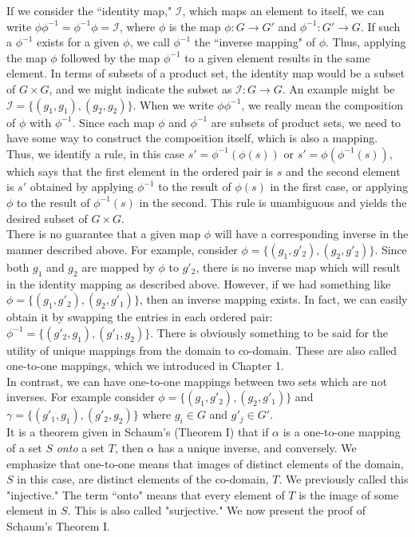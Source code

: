 If we consider the ``identity map," $\mathcal{I}$, which maps an element to itself, we can write $\phi \phi^{-1}=\phi^{-1} \phi = \mathcal{I}$, where $\phi$ is the map $\phi: G \rightarrow G'$ and $\phi^{-1}: G' \rightarrow G$.  If such a $\phi^{-1}$ exists for a given $\phi$, we call $\phi^{-1}$ the ``inverse mapping" of $\phi$.  Thus, applying the map $\phi$ followed by the map $\phi^{-1}$ to a given element results in the same element.  In terms of subsets of a product set, the identity map would be a subset of $G \times G$, and we might indicate the subset as $\mathcal{I}: G \rightarrow G$.  An example might be $\mathcal{I}=\{(g_{1},g_{1}), (g_{2},g_{2}) \}$.  When we write $\phi \phi^{-1}$, we really mean the composition of $\phi$ with $\phi^{-1}$.  Since each map $\phi$ and $\phi^{-1}$ are subsets of product sets, we need to have some way to construct the composition itself, which is also a mapping.  Thus, we identify a rule, in this case $s'=\phi^{-1}(\phi(s))$ or $s'=\phi(\phi^{-1}(s))$, which says that the first element in the ordered pair is $s$ and the second element is $s'$ obtained by applying $\phi^{-1}$ to the result of $\phi(s)$ in the first case, or applying $\phi$ to the result of $\phi^{-1}(s)$ in the second.  This rule is unambiguous and yields the desired subset of $G \times G$.\\

There is no guarantee that a given map $\phi$ will have a corresponding inverse in the manner described above.  For example, consider $\phi=\{(g_{1}, g'_{2}), (g_{2}, g'_{2}) \}$.  Since both $g_{1}$ and $g_{2}$ are mapped by $\phi$ to $g'_{2}$, there is no inverse map which will result in the identity mapping as described above.  However, if we had something like  $\phi=\{(g_{1}, g'_{2}), (g_{2}, g'_{1}) \}$, then an inverse mapping exists.  In fact, we can easily obtain it by swapping the entries in each ordered pair:  $\phi^{-1}=\{(g'_{2}, g_{1} ), (g'_{1}, g_{2} ) \}$.  There is obviously something to be said for the utility of unique mappings from the domain to co-domain.  These are also called one-to-one mappings, which we introduced in Chapter 1.\\

In contrast, we can have one-to-one mappings between two sets which are not inverses.  For example consider  $\phi=\{(g_{1}, g'_{2}), (g_{2}, g'_{1}) \}$ and $\gamma = \{(g'_{1}, g_{1}), (g'_{2}, g_{2}) \}$ where $g_{i} \in G$ and $g'_{j} \in G'$.\\  

It is a theorem given in Schaum's (Theorem I) that if $\alpha$ is a one-to-one mapping of a set $S$ \textit{onto} a set $T$, then $\alpha$ has a unique inverse, and conversely.  We emphasize that one-to-one means that images of distinct elements of the domain, $S$ in this case, are distinct elements of the co-domain, $T$.  We previously called this "injective."  The term ``onto" means that every element of $T$ is the image of some element in $S$.  This is also called "surjective."  We now present the proof of Schaum's Theorem I.\\

